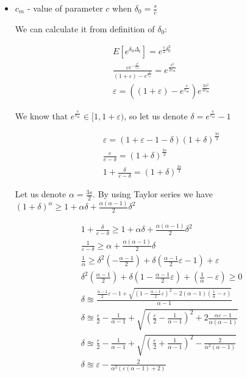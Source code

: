 \documentclass[12pt, a4paper]{article}
\theoremstyle{remark}
\theoremstyle{definition}
\begin{document}
\begin{itemize}
    \item \(c_m\) - value of parameter \(c\) when \(\delta_0 = \frac{s}{c}\)
    
    We can calculate it from definition of \(\delta_0\):

    \begin{gather*}
        E[e^{\delta_0 \Delta_t}] = e^{\frac{c}{2}\delta_0^2} \\
        \frac{\varepsilon e^{-\frac{s^2}{c_m}}}{(1 + \varepsilon) - e^{\frac{s}{c_m}}}  = e^{\frac{s^2}{2c_m}} \\
        \varepsilon = ((1 + \varepsilon) - e^{\frac{s}{c_m}}) e^{\frac{3s^2}{2c_m}}
    \end{gather*}

    We know that \(e^{\frac{s}{c_m}} \in [1, 1 + \varepsilon)\), so let us denote \(\delta = e^{\frac{s}{c_m}} - 1\)

    \begin{gather*}
        \varepsilon = (1 + \varepsilon - 1 - \delta) (1 + \delta)^{\frac{3s}{2}} \\
        \frac{e}{e - \delta} = (1 + \delta)^{\frac{3s}{2}} \\
        1 + \frac{\delta}{\varepsilon - \delta} = (1 + \delta)^{\frac{3s}{2}}
    \end{gather*}

    Let us denote \(\alpha = \frac{3s}{2}\). By using Taylor series we have \((1 + \delta)^{\alpha} \geq 1 + \alpha \delta + \frac{\alpha (\alpha - 1)}{2} \delta^2\)

    \begin{gather*}
        1 + \frac{\delta}{\varepsilon - \delta} \geq 1 + \alpha \delta + \frac{\alpha (\alpha - 1)}{2} \delta^2 \\
        \frac{1}{\varepsilon - \delta} \geq \alpha + \frac{\alpha (\alpha - 1)}{2} \delta \\
        \frac{1}{\alpha} \geq \delta^2 \left(-\frac{\alpha - 1}{2}\right) + \delta \left(\frac{\alpha - 1}{2}\varepsilon - 1\right) + \varepsilon \\
        \delta^2\left(\frac{\alpha - 1}{2}\right) + \delta \left(1 - \frac{\alpha - 1}{2}\varepsilon\right) + \left(\frac{1}{\alpha} - \varepsilon\right) \geq 0 \\
        \delta \approxeq \frac{\frac{\alpha - 1}{2}\varepsilon - 1 + \sqrt{\left(1 - \frac{\alpha - 1}{2}\varepsilon\right)^2 - 2 (\alpha - 1)(\frac{1}{\alpha} - \varepsilon)}}{\alpha - 1} \\
        \delta \approxeq \frac{\varepsilon}{2} - \frac{1}{\alpha - 1} + \sqrt{\left(\frac{\varepsilon}{2} - \frac{1}{\alpha - 1}\right)^2 + 2 \frac{\alpha \varepsilon - 1}{\alpha(\alpha - 1)}} \\
        \delta \approxeq \frac{\varepsilon}{2} - \frac{1}{\alpha - 1} + \sqrt{\left(\frac{\varepsilon}{2} + \frac{1}{\alpha - 1}\right)^2 - \frac{2}{\alpha^2(\alpha - 1)}} \\
        \delta \approxeq \varepsilon - \frac{2}{\alpha^2(\varepsilon(\alpha - 1) + 2)}
    \end{gather*}


\end{itemize}
\end{document}
